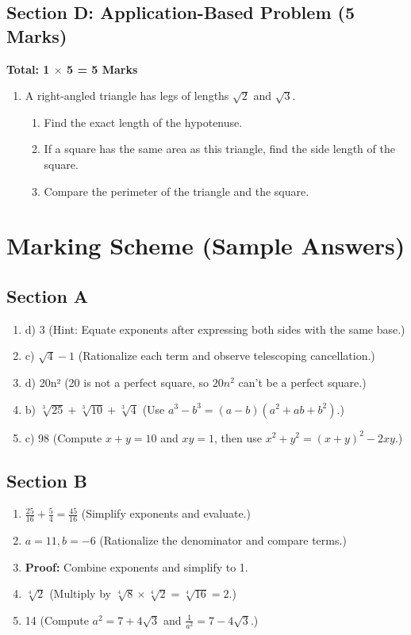 \documentclass[12pt]{article}
\begin{document}
	\subsection*{Section D: Application-Based Problem (5 Marks)}
	\textbf{Total: 1 $\times$ 5 = 5 Marks}
	
	\begin{enumerate}[start=16]
		\item A right-angled triangle has legs of lengths $\sqrt{2}$ and $\sqrt{3}$.
		\begin{enumerate}[label=(\alph*)]
			\item Find the exact length of the hypotenuse.
			\item If a square has the same area as this triangle, find the side length of the square.
			\item Compare the perimeter of the triangle and the square.
		\end{enumerate}
	\end{enumerate}
	
	\section*{Marking Scheme (Sample Answers)}
	
	\subsection*{Section A}
	\begin{enumerate}
		\item d) 3 \quad (Hint: Equate exponents after expressing both sides with the same base.)
		\item c) $\sqrt{4} - 1$ \quad (Rationalize each term and observe telescoping cancellation.)
		\item d) 20n² \quad (20 is not a perfect square, so $20n^2$ can't be a perfect square.)
		\item b) $\sqrt[3]{25} + \sqrt[3]{10} + \sqrt[3]{4}$ \quad (Use $a^3 - b^3 = (a - b)(a^2 + ab + b^2)$.)
		\item c) 98 \quad (Compute $x + y = 10$ and $xy = 1$, then use $x^2 + y^2 = (x + y)^2 - 2xy$.)
	\end{enumerate}
	
	\subsection*{Section B}
	\begin{enumerate}[start=6]
		\item $\frac{25}{16} + \frac{5}{4} = \frac{45}{16}$ \quad (Simplify exponents and evaluate.)
		\item $a = 11, b = -6$ \quad (Rationalize the denominator and compare terms.)
		\item \textbf{Proof:} Combine exponents and simplify to 1.
		\item $\sqrt[4]{2}$ \quad (Multiply by $\sqrt[4]{8} \times \sqrt[4]{2} = \sqrt[4]{16} = 2$.)
		\item 14 \quad (Compute $a^2 = 7 + 4\sqrt{3}$ and $\frac{1}{a^2} = 7 - 4\sqrt{3}$.)
	\end{enumerate}
	
\end{document}
